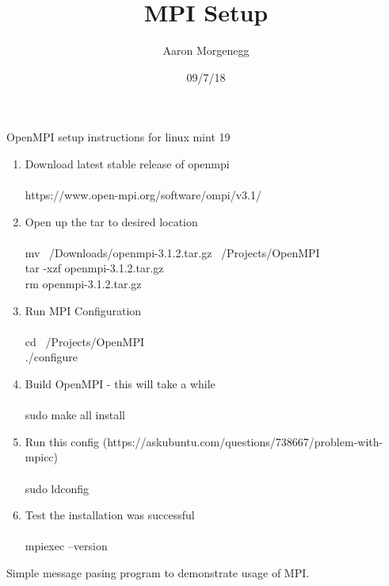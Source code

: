 \documentclass[12pt]{article}
\title{MPI Setup}
\author{Aaron Morgenegg}
\date{09/7/18}
\begin{document}
\maketitle

OpenMPI setup instructions for linux mint 19

\begin{enumerate}
  \item Download latest stable release of openmpi \\ \\
  \indent https://www.open-mpi.org/software/ompi/v3.1/
  \item Open up the tar to desired location \\ \\
  \indent mv ~/Downloads/openmpi-3.1.2.tar.gz ~/Projects/OpenMPI \\
  \indent tar -xzf openmpi-3.1.2.tar.gz \\
  \indent rm openmpi-3.1.2.tar.gz \\
  \item Run MPI Configuration \\ \\
  \indent cd ~/Projects/OpenMPI \\
  \indent ./configure \\
  \item Build OpenMPI - this will take a while \\ \\
  \indent sudo make all install \\
  \item Run this config (https://askubuntu.com/questions/738667/problem-with-mpicc) \\ \\
  \indent sudo ldconfig
  \item Test the installation was successful \\ \\
  \indent mpiexec --version

\end{enumerate}

Simple message pasing program to demonstrate usage of MPI.
\end{document}

